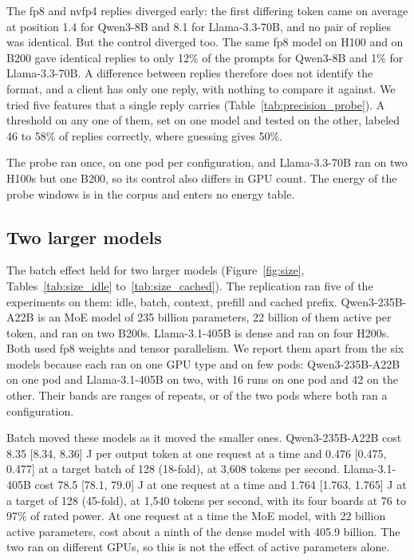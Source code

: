 \documentclass[11pt]{article}
\begin{document}
The fp8 and nvfp4 replies diverged early: the first differing token came on average at position 1.4 for Qwen3-8B and 8.1 for Llama-3.3-70B, and no pair of replies was identical. But the control diverged too. The same fp8 model on H100 and on B200 gave identical replies to only 12\% of the prompts for Qwen3-8B and 1\% for Llama-3.3-70B. A difference between replies therefore does not identify the format, and a client has only one reply, with nothing to compare it against. We tried five features that a single reply carries (Table~\ref{tab:precision_probe}). A threshold on any one of them, set on one model and tested on the other, labeled 46 to 58\% of replies correctly, where guessing gives 50\%.

The probe ran once, on one pod per configuration, and Llama-3.3-70B ran on two H100s but one B200, so its control also differs in GPU count. The energy of the probe windows is in the corpus and enters no energy table.

\subsection{Two larger models}\label{sec:size}

The batch effect held for two larger models (Figure~\ref{fig:size}, Tables~\ref{tab:size_idle} to~\ref{tab:size_cached}). The replication ran five of the experiments on them: idle, batch, context, prefill and cached prefix. Qwen3-235B-A22B is an MoE model of 235 billion parameters, 22 billion of them active per token, and ran on two B200s. Llama-3.1-405B is dense and ran on four H200s. Both used fp8 weights and tensor parallelism. We report them apart from the six models because each ran on one GPU type and on few pods: Qwen3-235B-A22B on one pod and Llama-3.1-405B on two, with 16 runs on one pod and 42 on the other. Their bands are ranges of repeats, or of the two pods where both ran a configuration.

Batch moved these models as it moved the smaller ones. Qwen3-235B-A22B cost 8.35 [8.34, 8.36] J per output token at one request at a time and 0.476 [0.475, 0.477] at a target batch of 128 (18-fold), at 3,608 tokens per second. Llama-3.1-405B cost 78.5 [78.1, 79.0] J at one request at a time and 1.764 [1.763, 1.765] J at a target of 128 (45-fold), at 1,540 tokens per second, with its four boards at 76 to 97\% of rated power. At one request at a time the MoE model, with 22 billion active parameters, cost about a ninth of the dense model with 405.9 billion. The two ran on different GPUs, so this is not the effect of active parameters alone.
\end{document}
